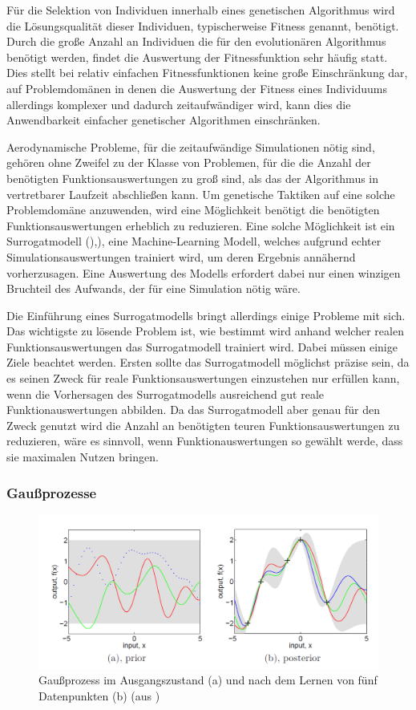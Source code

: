 \label{sub:surrogate}
Für die Selektion von Individuen innerhalb eines genetischen Algorithmus wird die Lösungsqualität dieser Individuen, typischerweise Fitness genannt, benötigt.
Durch die große Anzahl an Individuen die für den evolutionären Algorithmus benötigt werden, findet die Auswertung der Fitnessfunktion sehr häufig statt.
Dies stellt bei relativ einfachen Fitnessfunktionen keine große Einschränkung dar, auf Problemdomänen in denen die Auswertung der Fitness eines Individuums allerdings komplexer und dadurch zeitaufwändiger wird, kann dies die Anwendbarkeit einfacher genetischer Algorithmen einschränken.

Aerodynamische Probleme, für die zeitaufwändige Simulationen nötig sind, gehören ohne Zweifel zu der Klasse von Problemen, für die die Anzahl der benötigten Funktionsauswertungen zu groß sind, als das der Algorithmus in vertretbarer Laufzeit abschließen kann.
Um genetische Taktiken auf eine solche Problemdomäne anzuwenden, wird eine Möglichkeit benötigt die benötigten Funktionsauswertungen erheblich zu reduzieren.
Eine solche Möglichkeit ist ein Surrogatmodell ()\cite{Jin.2011},\cite{Preen.2016}), eine Machine-Learning Modell, welches aufgrund echter Simulationsauswertungen trainiert wird, um deren Ergebnis annähernd vorherzusagen.
Eine Auswertung des Modells erfordert dabei nur einen winzigen Bruchteil des Aufwands, der für eine Simulation nötig wäre.

Die Einführung eines Surrogatmodells bringt allerdings einige Probleme mit sich.
Das wichtigste zu lösende Problem ist, wie bestimmt wird anhand welcher realen Funktionsauswertungen das Surrogatmodell trainiert wird.
Dabei müssen einige Ziele beachtet werden.
Ersten sollte das Surrogatmodell möglichst präzise sein, da es seinen Zweck für reale Funktionsauswertungen einzustehen nur erfüllen kann, wenn die Vorhersagen des Surrogatmodells ausreichend gut reale Funktionauswertungen abbilden.
Da das Surrogatmodell aber genau für den Zweck genutzt wird die Anzahl an benötigten teuren Funktionsauswertungen zu reduzieren, wäre es sinnvoll, wenn Funktionauswertungen so gewählt werde, dass sie maximalen Nutzen bringen.


\subsubsection{Gaußprozesse}
\label{sub:gp}
\begin{figure}[h]
	\centering
	\includegraphics[width=1\linewidth]{bilder/gp}
	\caption{Gaußprozess im Ausgangszustand (a) und nach dem Lernen von fünf Datenpunkten (b) (aus \cite{Rasmussen.2008})}
	\label{fig:gp}
\end{figure}

